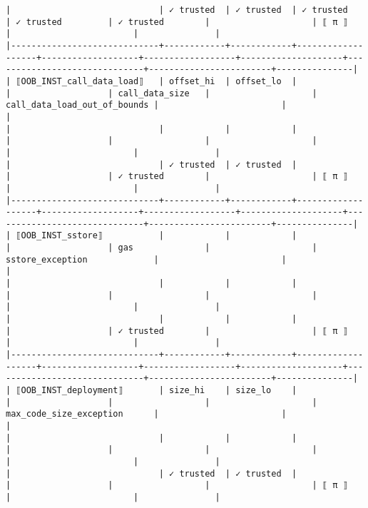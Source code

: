 \documentclass[varwidth=\maxdimen,margin=0.5cm,multi={verbatim}]{standalone}
\begin{document}
\begin{verbatim}
|                             | ✓ trusted  | ✓ trusted  | ✓ trusted         | ✓ trusted         | ✓ trusted        |                    | ⟦ π ⟧                        |                        |               |
|-----------------------------+------------+------------+-------------------+-------------------+------------------+--------------------+------------------------------+------------------------+---------------|
| ⟦OOB_INST_call_data_load⟧   | offset_hi  | offset_lo  |                   |                   | call_data_size   |                    | call_data_load_out_of_bounds |                        |               |
|                             |            |            |                   |                   |                  |                    |                              |                        |               |
|                             | ✓ trusted  | ✓ trusted  |                   |                   | ✓ trusted        |                    | ⟦ π ⟧                        |                        |               |
|-----------------------------+------------+------------+-------------------+-------------------+------------------+--------------------+------------------------------+------------------------+---------------|
| ⟦OOB_INST_sstore⟧           |            |            |                   |                   | gas              |                    | sstore_exception             |                        |               |
|                             |            |            |                   |                   |                  |                    |                              |                        |               |
|                             |            |            |                   |                   | ✓ trusted        |                    | ⟦ π ⟧                        |                        |               |
|-----------------------------+------------+------------+-------------------+-------------------+------------------+--------------------+------------------------------+------------------------+---------------|
| ⟦OOB_INST_deployment⟧       | size_hi    | size_lo    |                   |                   |                  |                    | max_code_size_exception      |                        |               |
|                             |            |            |                   |                   |                  |                    |                              |                        |               |
|                             | ✓ trusted  | ✓ trusted  |                   |                   |                  |                    | ⟦ π ⟧                        |                        |               |

\end{verbatim}
\end{document}
